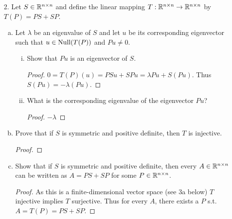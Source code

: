 \begin{itemize}
\begin{enumerate}[(a)]
\begin{proof}
$(\Leftarrow)$ Suppose $P = P^*$. Then $\ip{y}{z} = \ip{Py}{z} = \ip{y}{Pz} = 0$.
\end{proof}


\item Show that if $P=P^*$, then $||x||^2 = ||Px||^2 = ||Qx||^2$ for all $x \in X$.
\begin{proof}
$||Px||^2 = \ip{Px}{Px} = \ip{x}{Px}$, so $||x||^2 - ||Px||^2 = \ip{x}{x-Px} = 0$. Similarly with $Q = I-P$.
\end{proof}
\end{enumerate}











\item[2.] Let $S \in \mathbb{R}^{n \times n}$ and define the linear mapping $T: \mathbb{R}^{n \times n} \rightarrow \mathbb{R}^{n \times n}$ by $T(P) = PS+SP$.
\begin{enumerate}[(a)]
\item Let $\lambda$ be an eigenvalue of $S$ and let $u$ be its corresponding eigenvector such that $u \in \operatorname{Null}(T(P))$ and $Pu \neq 0$.
    \begin{enumerate}[(i)]
        \item Show that $Pu$ is an eigenvector of $S$.
        \begin{proof}
        $0 = T(P)(u) = PSu + SPu = \lambda Pu + S(Pu)$. Thus $S(Pu) = -\lambda (Pu)$.
        \end{proof}
        
        \item What is the corresponding eigenvalue of the eigenvector $Pu$?
        \begin{proof}
        $-\lambda$
        \end{proof}
    \end{enumerate}

\item Prove that if $S$ is symmetric and positive definite, then $T$ is injective.
\begin{proof}

\end{proof}

\item Show that if $S$ is symmetric and positive definite, then every $A \in \mathbb{R}^{n \times n}$ can be written as $A=PS+SP$ for some $P \in \mathbb{R}^{n \times n}$.
\begin{proof}
As this is a finite-dimensional vector space (see 3a below) $T$ injective implies $T$ surjective. Thus for every $A$, there exists a $P$ s.t. $A = T(P) = PS+SP$.
\end{proof}
\end{enumerate}








\end{itemize}
